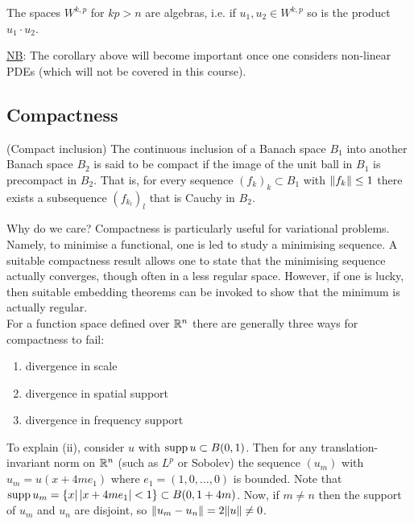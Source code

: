 \documentclass[11pt]{article}
\begin{document}
    		\begin{cor}
    			The spaces $W^{k,p}$ for $kp>n$ are algebras, i.e. if $u_1,u_2\in W^{k,p}$ so is the product $u_1\cdot u_2$.
    		\end{cor}
    
    		\noindent\underline{NB}: The corollary above will become important once one considers non-linear PDEs (which will not be covered in this course).
		
		
    	\subsection{Compactness}
    
    		\begin{defi}
    			(Compact inclusion) The continuous inclusion of a Banach space $B_1$ into another Banach space $B_2$ is said to be compact if the image of the unit ball in $B_1$ is precompact in $B_2$. That is, for every sequence $(f_k)_k\subset B_1$ with $\norm{f_k}\le1$ there exists a subsequence $(f_{k_l})_l$ that is Cauchy in $B_2$.
    		\end{defi}
    
    		Why do we care? Compactness is particularly useful for variational problems. Namely, to minimise a functional, one is led to study a minimising sequence. A suitable compactness result allows one to state that the minimising sequence actually converges, though often in a less regular space. However, if one is lucky, then suitable embedding theorems can be invoked to show that the minimum is actually regular.
    		\\
    		
    		\noindent For a function space defined over $\mathbb{R}^n$ there are generally three ways for compactness to fail:
    		\begin{enumerate}
    			\item divergence in scale
    			\item divergence in spatial support
    			\item divergence in frequency support
    		\end{enumerate}
    
    		To explain (ii), consider $u$ with $\operatorname{supp} u\subset B(0,1)$. Then for any translation-invariant norm on $\mathbb{R}^n$ (such as $L^p$ or Sobolev) the sequence $(u_m)$ with $u_m=u(x+4m e_1)$ where $e_1=(1,0,\dots,0)$ is bounded. Note that $\operatorname{supp} u_m=\{x|\,|x+4me_1|<1\}\subset B(0,1+4m)$. Now, if $m\neq n$ then the support of $u_m$ and $u_n$ are disjoint, so $\norm{u_m-u_n}=2\norm{u}\neq0$.
    
\end{document}
